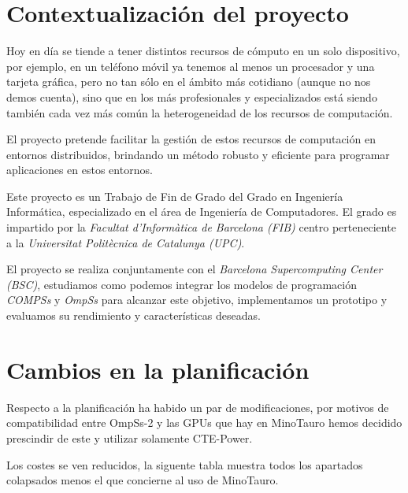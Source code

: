 \section{Contextualización del proyecto}

Hoy en día se tiende a tener distintos recursos de cómputo en un solo dispositivo, por ejemplo, en un teléfono móvil ya tenemos al menos un procesador y una tarjeta gráfica, pero no tan sólo en el ámbito más cotidiano (aunque no nos demos cuenta), sino que en los más profesionales y especializados está siendo también cada vez más común la heterogeneidad de los recursos de computación. 
\par\bigskip

El proyecto pretende facilitar la gestión de estos recursos de computación en entornos distribuidos, brindando un método robusto y eficiente para programar aplicaciones en estos entornos.
\par\bigskip

Este proyecto es un Trabajo de Fin de Grado del Grado en Ingeniería Informática, especializado en el área de Ingeniería de Computadores. El grado es impartido por la \textit{Facultat d'Informàtica de Barcelona (FIB)} centro perteneciente a la \textit{Universitat Politècnica de Catalunya (UPC)}. 
\par\bigskip

El proyecto se realiza conjuntamente con el \textit{Barcelona Supercomputing Center (BSC)}, estudiamos como podemos integrar los modelos de programación \textit{COMPSs} y \textit{OmpSs} para alcanzar este objetivo, implementamos un prototipo y evaluamos su rendimiento y características deseadas. 

\section{Cambios en la planificación}

Respecto a la planificación ha habido un par de modificaciones, por motivos de compatibilidad entre OmpSs-2 y las GPUs que hay en MinoTauro hemos decidido prescindir de este y utilizar solamente CTE-Power.
\bigskip

Los costes se ven reducidos, la siguente tabla muestra todos los apartados colapsados menos el que concierne al uso de MinoTauro.

